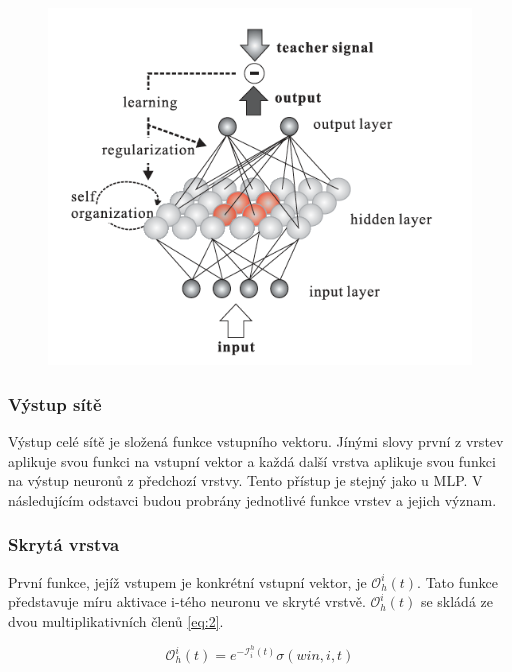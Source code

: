 \documentclass[thesis=M,czech]{FITthesis}[2012/06/26]
\begin{document}
\begin{figure}[htbp]
\begin{center}
	\includegraphics[scale=0.6]{crsom_structure}
\caption{}
\label{fig:crsom_structure}
\end{center}
\end{figure}
 
 

\subsubsection*{Výstup sítě}
Výstup celé sítě je složená funkce vstupního vektoru. 
Jínými slovy první z vrstev aplikuje svou funkci na vstupní vektor a každá další vrstva aplikuje svou funkci na výstup neuronů z předchozí vrstvy. Tento přístup je stejný jako u MLP. V následujícím odstavci budou probrány jednotlivé funkce vrstev a jejich význam.

\subsubsection*{Skrytá vrstva}
První funkce, jejíž vstupem je konkrétní vstupní vektor, je $ \mathcal{O}_h^i(t) $. Tato funkce představuje míru aktivace i-tého neuronu ve skryté vrstvě. $ \mathcal{O}_h^i(t) $ se skládá ze dvou multiplikativních členů \ref{eq:2}.

\begin{equation} \label{eq:2}
    \mathcal{O}_h^i(t) = e^{-\mathcal{I}_i^h(t)} \sigma(win, i, t)
\end{equation}
\end{document}
